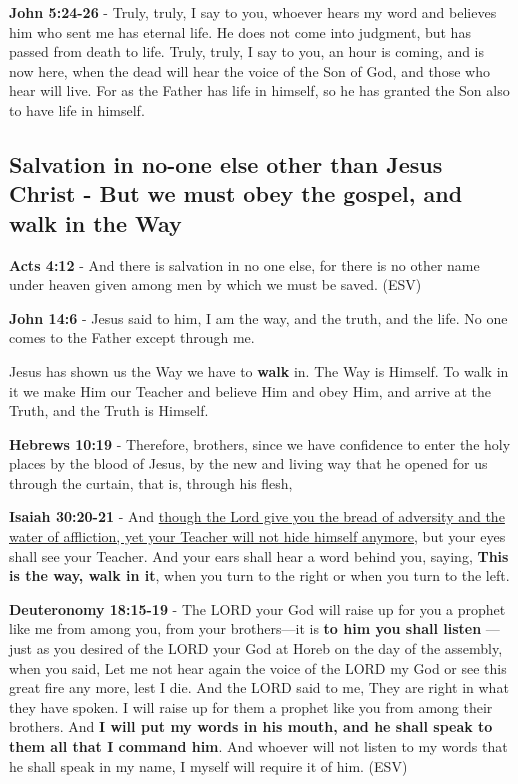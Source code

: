 \documentclass[11pt]{article}
\begin{document}
\textbf{John 5:24-26} - Truly, truly, I say to you, whoever hears my word and believes him who sent me has eternal life. He does not come into judgment, but has passed from death to life. Truly, truly, I say to you, an hour is coming, and is now here, when the dead will hear the voice of the Son of God, and those who hear will live. For as the Father has life in himself, so he has granted the Son also to have life in himself.

\subsection{Salvation in no-one else other than Jesus Christ - But we must obey the gospel, and walk in the Way}
\label{sec:org1ae4651}
\textbf{Acts 4:12} - And there is salvation in no one else, for there is no other name under heaven given among men by which we must be saved. (ESV)

\textbf{John 14:6} - Jesus said to him, I am the way, and the truth, and the life. No one comes to the Father except through me.

Jesus has shown us the Way we have to \textbf{walk} in. The Way is Himself. To walk in it we make Him our Teacher and believe Him and obey Him, and arrive at the Truth, and the Truth is Himself.

\textbf{Hebrews 10:19} - Therefore, brothers, since we have confidence to enter the holy places by the blood of Jesus, by the new and living way that he opened for us through the curtain, that is, through his flesh,

\textbf{Isaiah 30:20-21} - And \uline{though the Lord give you the bread of adversity and the water of affliction, yet your Teacher will not hide himself anymore}, but your eyes shall see your Teacher. And your ears shall hear a word behind you, saying, \textbf{This is the way, walk in it}, when you turn to the right or when you turn to the left.

\textbf{Deuteronomy 18:15-19} - The LORD your God will raise up for you a prophet like me from among you, from your brothers—it is \textbf{to him you shall listen} — just as you desired of the LORD your God at Horeb on the day of the assembly, when you said, Let me not hear again the voice of the LORD my God or see this great fire any more, lest I die. And the LORD said to me, They are right in what they have spoken. I will raise up for them a prophet like you from among their brothers. And \textbf{I will put my words in his mouth, and he shall speak to them all that I command him}. And whoever will not listen to my words that he shall speak in my name, I myself will require it of him. (ESV)
\end{document}
